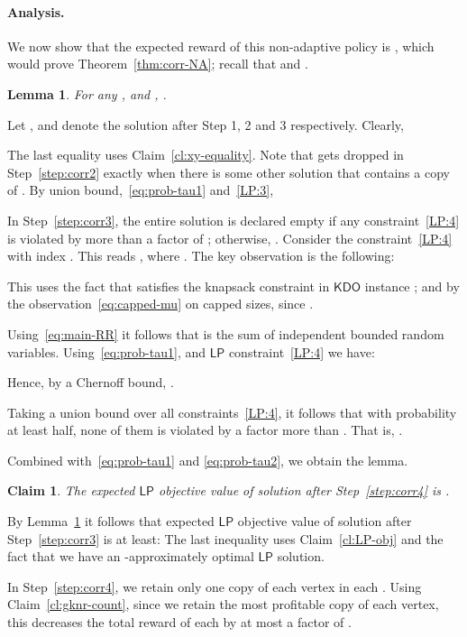 \documentclass[11pt,letterpaper]{article}
\newtheorem{lemma}[theorem]{Lemma}
\newtheorem{claim}[theorem]{Claim}
\numberwithin{algorithm}{section}
\newenvironment{proof}{

\noindent{\bf Proof:}}
{\hfill


}
\newcommand{\kdo}{\ensuremath{\mathsf{KDO}}\xspace}
\newcommand{\lp}{\ensuremath{\mathsf{LP}}\xspace}
\begin{document}
\paragraph{Analysis.} We now show that the expected reward of this non-adaptive policy is , which would prove Theorem~\ref{thm:corr-NA}; recall that  and .



\begin{lemma} \label{lem:RRalt}
For any ,  and ,
.
\end{lemma}
\begin{proof}
Let ,  and  denote the solution  after Step 1, 2 and 3 respectively. Clearly,
\vspace{-2mm}
\vspace{-3mm}

The last equality uses Claim~\ref{cl:xy-equality}. Note that  gets dropped in Step~\ref{step:corr2} exactly when there is some other solution  that contains a copy of . By union bound,~\eqref{eq:prob-tau1} and~\eqref{LP:3},
\vspace{-2mm}\vspace{-5mm}

In Step~\ref{step:corr3}, the entire solution is declared empty if any constraint~\eqref{LP:4} is violated by more than a factor of ; otherwise, . Consider the constraint~\eqref{LP:4} with index . This reads , where . The key observation is the following:

This uses the fact that  satisfies the knapsack constraint  in \kdo instance ; and by the observation~\eqref{eq:capped-mu} on capped sizes,  since .

Using~\eqref{eq:main-RR} it follows that  is the sum of independent  bounded random variables.  Using~\eqref{eq:prob-tau1}, and \lp constraint~\eqref{LP:4} we have:

Hence, by a Chernoff bound, {\small }.

Taking a union bound over all  constraints~\eqref{LP:4}, it follows that with probability at least half, none of them is violated by a factor more than . That is, .

Combined with~\eqref{eq:prob-tau1} and \eqref{eq:prob-tau2}, we obtain the lemma.
\end{proof}


\begin{claim}\label{cl:corr-exp}
The expected \lp objective value of solution  after Step~\ref{step:corr4} is .
\end{claim}
\begin{proof}
By Lemma~\ref{lem:RRalt} it follows that expected \lp objective value of solution  after Step~\ref{step:corr3} is at least:
{\small }
The last inequality uses Claim~\ref{cl:LP-obj} and the fact that we have an -approximately optimal \lp solution.

In Step~\ref{step:corr4}, we retain only one copy of each vertex in each . Using Claim~\ref{cl:gknr-count}, since we retain the most profitable copy of each vertex, this decreases the total reward of each  by at most a factor of . \end{proof}
\end{document}
